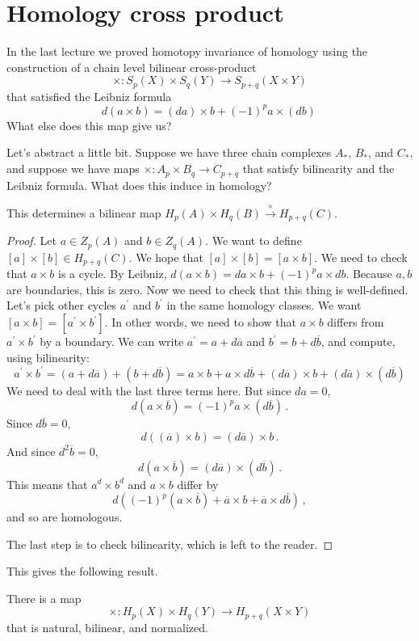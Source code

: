 \section{Homology cross product}

In the last lecture we proved homotopy invariance of homology using the
construction of a chain level bilinear cross-product
\[
\times:S_p(X)\times S_q(Y)\to S_{p+q}(X\times Y)
\]
that satisfied the Leibniz formula
\[
d(a\times b)=(da)\times b+(-1)^pa\times(db)\,
\]
What else does this map give us? 

Let's abstract a little bit. Suppose we have three chain complexes $A_*$, $B_*$, and $C_*$, and suppose we have maps $\times: A_p\times B_q\to C_{p+q}$ that satisfy bilinearity and the Leibniz formula. What does this induce in homology?
\begin{lemma}
This determines a bilinear map $ H_p(A)\times H_q(B)\xrightarrow{\times} H_{p+q}(C)$.
\end{lemma}
\begin{proof}
Let $a\in Z_p(A)$ and $b\in Z_q(A)$. We want to define $[a]\times [b]\in H_{p+q}(C)$. We hope that $[a]\times [b]=[a\times b]$. We need to check that $a\times b$ is a cycle. By Leibniz, $d(a\times b)=da\times b+(-1)^pa\times db$. Because $a,b$ are boundaries, this is zero. Now we need to check that this thing is well-defined. Let's pick other cycles $a^\prime$ and $b^\prime$ in the same homology classes. We want $[a\times b]=[a^\prime\times b^\prime]$. In other words, we need to show that $a\times b$ differs from $a^\prime\times b^\prime$ by a boundary. We can write $a^\prime=a+d\overline{a}$ and $b^\prime=b+d\overline{b}$, and compute, using bilinearity:
	\begin{equation*}
	a^\prime\times b^\prime=(a+d\overline{a})+(b+d\overline{b})
	= a\times b+a\times d\overline{b} + (d\overline{a})\times b+(d\overline{a})\times(d\overline{b})
	\end{equation*}
We need to deal with the last three terms here. But since $da=0$,
\[
d(a\times\overline b)=(-1)^pa\times(d\overline b)\,.
\]
Since $d\overline b=0$, 
\[
d((\overline a)\times b)=(d\overline a)\times b\,.
\]
And since $d^2\overline b=0$, 
\[ 
d(a\times\overline{b})=
(d\overline a)\times(d\overline{b})\,.
\]
This means that $a^d\times b^d$ and $a\times b$ differ by 
\[
d((-1)^p(a\times \overline{b}) + \overline{a}\times b + \overline{a}\times d\overline{b})\,,
\]
and so are homologous. 

The last step is to check bilinearity, which is left to the reader.
\end{proof}
This gives the following result.
\begin{theorem}
There is a map 
\[
\times:H_p(X)\times H_q(Y)\to H_{p+q}(X\times Y)
\]
that is natural, bilinear, and normalized. 
\end{theorem}

